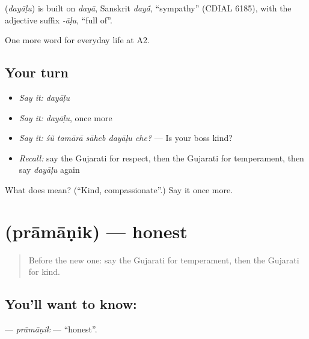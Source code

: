 \begin{cousinweb}
\textbf{} (\emph{dayāḷu}) is built on \emph{dayā}, Sanskrit \emph{day\'{\={a}}}, \textquotedblleft{}sympathy\textquotedblright{} (CDIAL 6185), with the adjective suffix \emph{-āḷu}, \textquotedblleft{}full of\textquotedblright{}.
\end{cousinweb}

\begin{grammarlens}[title={What you've built}]
One more word for everyday life at A2.
\end{grammarlens}

\subsection*{Your turn}
\begin{itemize}
\raggedright
  \item \emph{Say it:} \emph{dayāḷu}
  \item \emph{Say it:} \emph{dayāḷu}, once more
  \item \emph{Say it:} \emph{śũ tamārā sāheb dayāḷu che?} — Is your boss kind?
  \item \emph{Recall:} say the Gujarati for respect, then the Gujarati for temperament, then say \emph{dayāḷu} again
\end{itemize}

\begin{tcolorbox}[breakable,colback=teal!4,colframe=teal!35!black,title={Before you move on}]
What does  mean? (\textquotedblleft{}Kind, compassionate\textquotedblright{}.) Say it once more.
\end{tcolorbox}
\section[\texorpdfstring{\gu{પ્રામાણિક} (prāmāṇik)}{પ્રામાણિક (prāmāṇik)}]{ (prāmāṇik) — honest}

\label{lesson:GU-C270-pramanik}



\begin{quote}
Before the new one: say the Gujarati for temperament, then the Gujarati for kind.
\end{quote}

\subsection*{You'll want to know: }
\textbf{} — \emph{prāmāṇik} — \textquotedblleft{}honest\textquotedblright{}.

